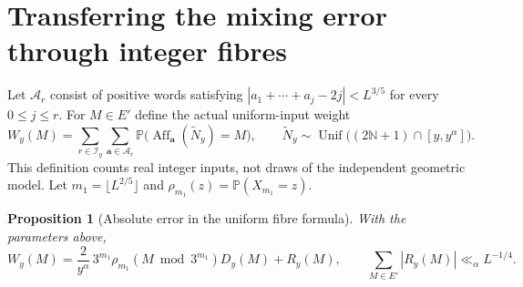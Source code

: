 \documentclass[11pt]{article}
\newtheorem{proposition}{Proposition}
\theoremstyle{remark}\newtheorem{remark}[proposition]{Remark}
\newcommand{\PP}{\mathbb P}
\newcommand{\NN}{\mathbb N}
\newcommand{\Aff}{\operatorname{Aff}}
\begin{document}
\section{Transferring the mixing error through integer fibres}

Let $\mathcal A_r$ consist of positive words satisfying
$|a_1+\cdots+a_j-2j|<L^{3/5}$ for every $0\le j\le r$.
For $M\in E'$ define the actual uniform-input weight
\[
 W_y(M)=\sum_{r\in\mathcal I_y}\sum_{\mathbf a\in\mathcal A_r}
 \PP\big(\Aff_{\mathbf a}(\widetilde N_y)=M\big),\qquad
 \widetilde N_y\sim\operatorname{Unif}\big((2\NN+1)\cap[y,y^\alpha]\big).
\]
This definition counts real integer inputs, not draws of the independent
geometric model. Let $m_1=\lfloor L^{2/5}\rfloor$ and
$\rho_{m_1}(z)=\PP(X_{m_1}=z)$.

\begin{proposition}[Absolute error in the uniform fibre formula]
\label{prop:fibre-master}
With the parameters above,
\[
 W_y(M)=\frac{2}{y^\alpha}\,3^{m_1}
       \rho_{m_1}(M\bmod3^{m_1})D_y(M)+R_y(M),\qquad
 \sum_{M\in E'}|R_y(M)|\ll_\alpha L^{-1/4}.
\]
\end{proposition}
\end{document}
